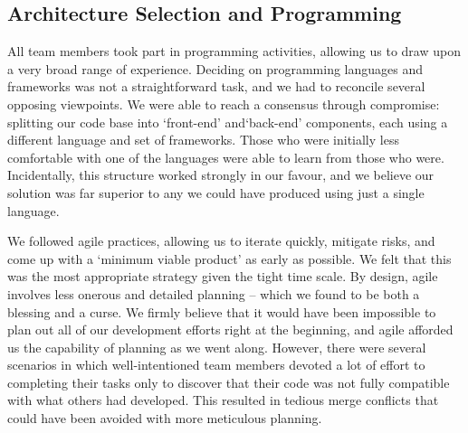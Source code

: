 \subsection{Architecture Selection and Programming}
All team members took part in programming activities, allowing us to draw upon a very broad range of experience. Deciding on programming languages and frameworks was not a straightforward task, and we had to reconcile several opposing viewpoints. We were able to reach a consensus through compromise: splitting our code base into `front-end’ and`back-end’ components, each using a different language and set of frameworks. Those who were initially less comfortable with one of the languages were able to learn from those who were. Incidentally, this structure worked strongly in our favour, and we believe our solution was far superior to any we could have produced using just a single language.

We followed agile practices, allowing us to iterate quickly, mitigate risks, and come up with a `minimum viable product’ as early as possible. We felt that this was the most appropriate strategy given the tight time scale. By design, agile involves less onerous and detailed planning -- which we found to be both a blessing and a curse. We firmly believe that it would have been impossible to plan out all of our development efforts right at the beginning, and agile afforded us the capability of planning as we went along. However, there were several scenarios in which well-intentioned team members devoted a lot of effort to completing their tasks only to discover that their code was not fully compatible with what others had developed. This resulted in tedious merge conflicts that could have been avoided with more meticulous planning.

